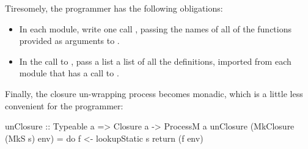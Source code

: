 \documentclass{sigplanconf}
\begin{document}
Tiresomely, the programmer has the following obligations:
\begin{itemize}
\item In each module, write one call ,
passing the names of all of the functions provided as arguments to .
\item In the call to , pass a list
a list of all the  definitions, imported from
each module that has a call to .
\end{itemize}

Finally, the closure un-wrapping process becomes monadic, which is
a little less convenient for the programmer:
\begin{code}
  unClosure :: Typeable a => Closure a -> ProcessM a
  unClosure (MkClosure (MkS s) env)
        = do f <- lookupStatic s
             return (f env)
\end{code}
\end{document}

